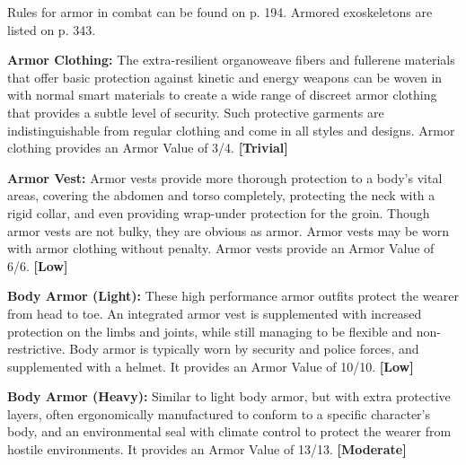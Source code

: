 Rules for armor in combat can be found on p. 194. 
Armored exoskeletons are listed on p. 343.

\textbf{Armor Clothing:} The extra-resilient organoweave 
fibers and fullerene materials that offer basic protection
against kinetic and energy weapons can be woven
in with normal smart materials to create a wide range 
of discreet armor clothing that provides a subtle level 
of security. Such protective garments are indistinguishable
from regular clothing and come in all styles
and designs. Armor clothing provides an Armor Value 
of 3/4. \textbf{[Trivial]}

\textbf{Armor Vest:} Armor vests provide more thorough 
protection to a body's vital areas, covering the abdomen
and torso completely, protecting the neck with a
rigid collar, and even providing wrap-under protection
for the groin. Though armor vests are not bulky,
they are obvious as armor. Armor vests may be worn 
with armor clothing without penalty. Armor vests 
provide an Armor Value of 6/6. \textbf{[Low]}

\textbf{Body Armor (Light):} These high performance armor 
outfits protect the wearer from head to toe. An integrated
armor vest is supplemented with increased protection
on the limbs and joints, while still managing to
be flexible and non-restrictive. Body armor is typically 
worn by security and police forces, and supplemented 
with a helmet. It provides an Armor Value of 10/10. 
\textbf{[Low]}

\textbf{Body Armor (Heavy):} Similar to light body armor, 
but with extra protective layers, often ergonomically 
manufactured to conform to a specific  character's 
body, and an environmental seal with climate control 
to protect the wearer from hostile environments. It 
provides an Armor Value of 13/13. \textbf{[Moderate]}

